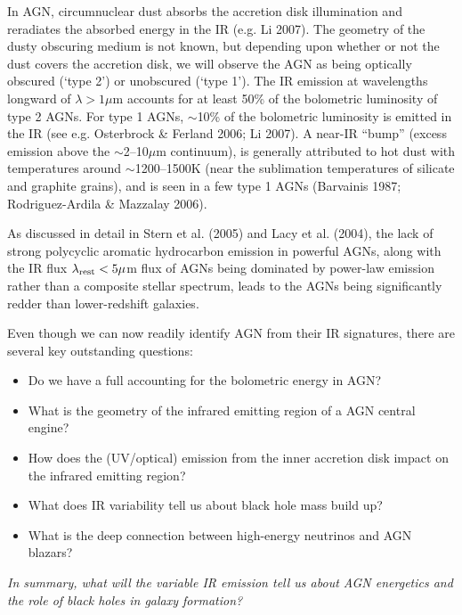 \documentclass[12pt]{article}
\begin{document}
\smallskip
\smallskip
\noindent
In AGN, circumnuclear dust absorbs the accretion disk illumination and
reradiates the absorbed energy in the IR (e.g. Li 2007). The geometry
of the dusty obscuring medium is not known, but depending upon whether or 
not the dust covers the accretion disk, we will observe the AGN as being optically obscured (`type 2') or unobscured
(`type 1'). The IR emission at wavelengths longward of $\lambda > 1
\mu$m accounts for at least 50\% of the bolometric luminosity of type
2 AGNs. For type 1 AGNs, $\sim$10\% of the bolometric luminosity is
emitted in the IR (see e.g. Osterbrock \& Ferland 2006; Li 2007). A
near-IR ``bump'' (excess emission above the $\sim$2–10$\mu$m
continuum), is generally attributed to hot dust with temperatures
around $\sim$1200–1500K (near the sublimation temperatures of
silicate and graphite grains), and is seen in a few type 1 AGNs
(Barvainis 1987; Rodriguez-Ardila \& Mazzalay 2006).

\smallskip
\smallskip
\noindent
As discussed in detail in Stern et al. (2005) and Lacy et al. (2004), the lack of strong
polycyclic aromatic hydrocarbon emission in powerful AGNs, along with
the IR flux $\lambda_{\rm rest} < 5 \mu$m flux of AGNs being dominated
by power-law emission rather than a composite stellar spectrum, leads
to the AGNs being significantly redder than lower-redshift galaxies.

\smallskip
\smallskip
\noindent
Even though we can now readily identify AGN from their IR signatures, 
there are several key outstanding questions:  

\begin{itemize}
\item Do we have a full accounting for the bolometric energy in AGN?
\item What is the geometry of the infrared emitting region of a AGN central engine?
\item How does the (UV/optical) emission from the inner accretion disk impact on the infrared emitting region?
\item What does IR variability tell us about black hole mass build up?
\item What is the deep connection between high-energy neutrinos and AGN blazars? 
\end{itemize}

\noindent
{\it In summary, what will the variable IR emission tell us about AGN energetics and the 
role of black holes in galaxy formation?}
\end{document}
